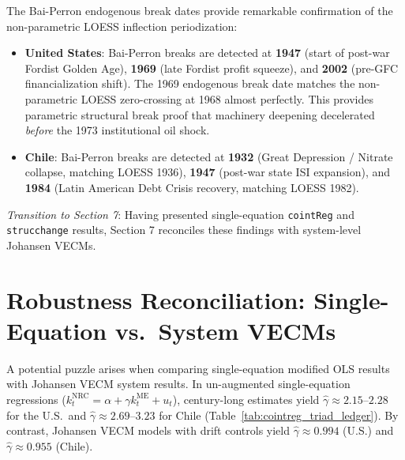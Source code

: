 \documentclass[11pt,a4paper]{article}
\begin{document}
The Bai-Perron endogenous break dates provide remarkable confirmation of the non-parametric LOESS inflection periodization:
\begin{itemize}
    \item \textbf{United States}: Bai-Perron breaks are detected at \textbf{1947} (start of post-war Fordist Golden Age), \textbf{1969} (late Fordist profit squeeze), and \textbf{2002} (pre-GFC financialization shift). The 1969 endogenous break date matches the non-parametric LOESS zero-crossing at 1968 almost perfectly. This provides parametric structural break proof that machinery deepening decelerated \textit{before} the 1973 institutional oil shock.
    \item \textbf{Chile}: Bai-Perron breaks are detected at \textbf{1932} (Great Depression / Nitrate collapse, matching LOESS 1936), \textbf{1947} (post-war state ISI expansion), and \textbf{1984} (Latin American Debt Crisis recovery, matching LOESS 1982).
\end{itemize}

\textit{Transition to Section 7}: Having presented single-equation \texttt{cointReg} and \texttt{strucchange} results, Section 7 reconciles these findings with system-level Johansen VECMs.

\FloatBarrier
\section{Robustness Reconciliation: Single-Equation vs.\ System VECMs}

A potential puzzle arises when comparing single-equation modified OLS results with Johansen VECM system results. In un-augmented single-equation regressions ($k_t^{\text{NRC}} = \alpha + \gamma k_t^{\text{ME}} + u_t$), century-long estimates yield $\hat{\gamma} \approx 2.15$--$2.28$ for the U.S.\ and $\hat{\gamma} \approx 2.69$--$3.23$ for Chile (Table~\ref{tab:cointreg_triad_ledger}). By contrast, Johansen VECM models with drift controls yield $\hat{\gamma} \approx 0.994$ (U.S.) and $\hat{\gamma} \approx 0.955$ (Chile).
\end{document}

